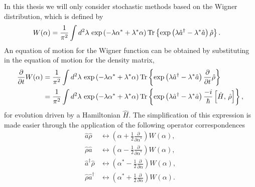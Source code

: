In this thesis we will only consider stochastic methods based on the Wigner distribution, which is defined by \citep{Scully}
\begin{align}
    W(\alpha) &= \frac{1}{\pi^2} \int d^2 \lambda\, \exp\left(-\lambda \alpha^* + \lambda^* \alpha\right) \operatorname{Tr}\left\{ \exp\left(\lambda \hat{a}^\dagger - \lambda^* \hat{a}\right) \hat{\rho} \right\}.
\end{align}
An equation of motion for the Wigner function can be obtained by substituting in the equation of motion for the density matrix,
\begin{align}
    \frac{\partial}{\partial t} W(\alpha) &= \frac{1}{\pi^2} \int d^2 \lambda\, \exp\left(-\lambda \alpha^* + \lambda^* \alpha\right) \operatorname{Tr}\left\{ \exp\left(\lambda \hat{a}^\dagger - \lambda^* \hat{a}\right) \frac{\partial}{\partial t}\hat{\rho}\right\} \notag \\
    &= \frac{1}{\pi^2} \int d^2 \lambda\, \exp\left(-\lambda \alpha^* + \lambda^* \alpha\right) \operatorname{Tr}\left\{ \exp\left(\lambda \hat{a}^\dagger - \lambda^* \hat{a}\right) \frac{-i}{\hbar} \left[\hat{H},\, \hat{\rho} \right]\right\},
\end{align}
for evolution driven by a Hamiltonian $\hat{H}$.  The simplification of this expression is made easier through the application of the following operator correspondences \citep[\S 4.5]{GardinerQN}
\begin{subequations}
    \begin{align}
        \hat{a} \hat{\rho} &\leftrightarrow \left(\alpha + \frac{1}{2} \frac{\partial}{\partial \alpha^*} \right) W(\alpha), \\
        \hat{\rho} \hat{a} & \leftrightarrow \left(\alpha - \frac{1}{2} \frac{\partial}{\partial \alpha^*} \right) W(\alpha), \\
        \hat{a}^\dagger \hat{\rho} & \leftrightarrow \left( \alpha^* - \frac{1}{2} \frac{\partial}{\partial \alpha} \right) W(\alpha), \\
        \hat{\rho} \hat{a}^\dagger & \leftrightarrow \left( \alpha^* + \frac{1}{2} \frac{\partial}{\partial \alpha} \right) W(\alpha).
    \end{align}
\end{subequations}

